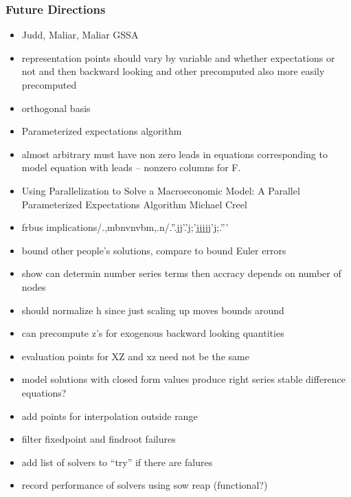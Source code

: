 \documentclass[tikz]{beamer}
\begin{document}

\begin{frame}
  \frametitle{Future Directions}
  \begin{itemize}
  \item Judd, Maliar, Maliar GSSA
  \item representation points should vary by variable and whether expectations or not and then backward looking and other precomputed also more easily precomputed
  \item orthogonal basis
  \item Parameterized expectations algorithm
  \item almost arbitrary must have non zero leads in equations corresponding to model equation with leads -- nonzero columns for F.
  \item Using Parallelization to Solve a Macroeconomic Model: A Parallel Parameterized Expectations Algorithm
Michael Creel
  \item frbus implications/.,mbnvnvbm,.n/.''.jj'.'j;'jjjjj'j;.'''
  \item bound other people's solutions, compare to bound Euler errors
  \item show can determin number series terms then accracy depends on number of nodes
  \item should normalize h since just scaling up moves bounds around
  \item can precompute z's for exogenous backward looking quantities
  \item evaluation points for XZ and xz need not be the same
  \item model solutions with closed form values produce right series stable difference equations?
  \item add points for interpolation outside range
  \item filter fixedpoint and findroot failures
  \item add list of solvers to ``try'' if there are falures
  \item record performance of solvers using sow reap (functional?)

\end{itemize}
\end{frame}
\end{document}
